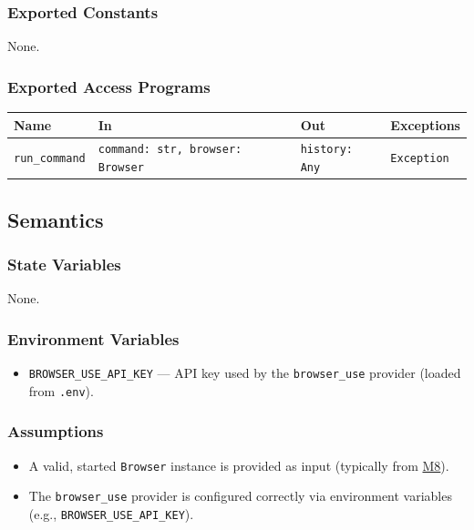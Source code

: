 \documentclass[12pt, titlepage]{article}
\begin{document}
\subsubsection{Exported Constants}
None.

\subsubsection{Exported Access Programs}

\begin{center}
\begin{tabular}{|l|l|l|l|}
\hline
\textbf{Name} & \textbf{In} & \textbf{Out} & \textbf{Exceptions} \\
\hline
\texttt{run\_command} & \texttt{command: str, browser: Browser} & \texttt{history: Any} & \texttt{Exception} \\
\hline
\end{tabular}
\end{center}

\subsection{Semantics}

\subsubsection{State Variables}
None.

\subsubsection{Environment Variables}
\begin{itemize}
  \item \texttt{BROWSER\_USE\_API\_KEY} --- API key used by the \texttt{browser\_use} provider (loaded from \texttt{.env}).
\end{itemize}

\subsubsection{Assumptions}
\begin{itemize}
  \item A valid, started \texttt{Browser} instance is provided as input (typically from \hyperref[M8]{M8}).
  \item The \texttt{browser\_use} provider is configured correctly via environment variables (e.g., \texttt{BROWSER\_USE\_API\_KEY}).
\end{itemize}
\end{document}
